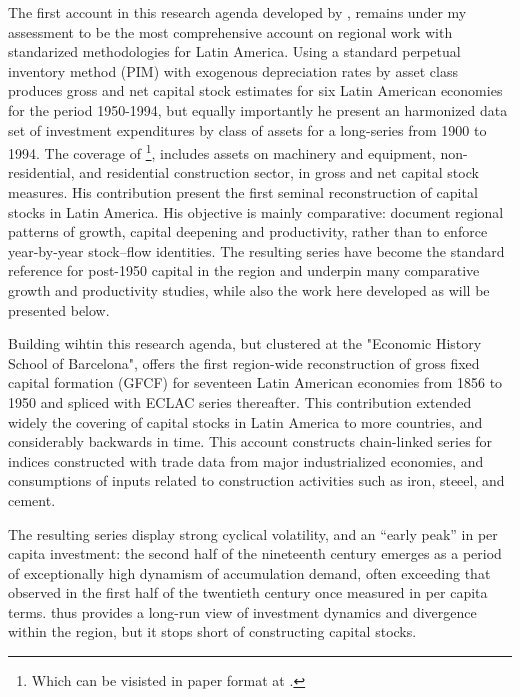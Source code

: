 \documentclass[11pt,a4paper]{article}
\begin{document}
The first account in this research agenda developed by \citet{Hofman2000a,Hofman2000b}, remains under my assessment to be the most comprehensive account on regional work with standarized methodologies for Latin America. Using a standard perpetual inventory method (PIM) with exogenous depreciation rates by asset class \citet{Hofman2000a} produces gross and net capital stock estimates for six Latin American economies for the period 1950-1994, but equally importantly he present an harmonized data set of investment expenditures by class of assets for a long-series from 1900 to 1994. The coverage of \citet{Hofman2000a}  \footnote{Which can be visisted in paper format at \citet{Hofman2000b}.}, includes assets on machinery and equipment, non-residential, and residential construction sector, in gross and net capital stock measures. His contribution present the first seminal reconstruction of capital stocks in Latin America. His objective is mainly comparative: document regional patterns of growth, capital deepening and productivity, rather than to enforce year-by-year stock--flow identities. The resulting series have become the standard reference for post-1950 capital in the region and underpin many comparative growth and productivity studies, while also the work here developed as will be presented below. 

Building wihtin this research agenda, but clustered at the "Economic History School of Barcelona", \citet{Tafunell2013} offers the first region-wide reconstruction of gross fixed capital formation (GFCF) for seventeen Latin American economies from 1856 to 1950 and spliced with ECLAC series thereafter. This contribution extended widely the covering of capital stocks in Latin America to more countries, and considerably backwards in time. This account constructs chain-linked series for indices constructed with trade data from major industrialized economies, and consumptions of inputs related to construction activities such as iron, steeel, and cement.   

The resulting series display strong cyclical volatility, and an ``early peak'' in per capita investment: the second half of the nineteenth century emerges as a period of exceptionally high dynamism of accumulation demand, often exceeding that observed in the first half of the twentieth century once measured in per capita terms. \citet{Tafunell2013} thus provides a long-run view of investment dynamics and divergence within the region, but it stops short of constructing capital stocks. 
\end{document}
